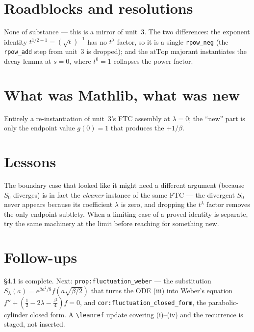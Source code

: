 \documentclass[11pt]{article}
\begin{document}
\section{Roadblocks and resolutions}
None of substance --- this is a mirror of unit~3. The two differences: the exponent identity
$t^{1/2-1}=(\sqrt t)^{-1}$ has no $t^\lambda$ factor, so it is a single \texttt{rpow\_neg} (the
\texttt{rpow\_add} step from unit~3 is dropped); and the $\mathrm{atTop}$ majorant instantiates the
decay lemma at $s=0$, where $t^0=1$ collapses the power factor.

\section{What was Mathlib, what was new}
Entirely a re-instantiation of unit~3's FTC assembly at $\lambda=0$; the ``new'' part is only the
endpoint value $g(0)=1$ that produces the $+1/\beta$.

\section{Lessons}
The boundary case that looked like it might need a different argument (because $S_0$ diverges) is in
fact the \emph{cleaner} instance of the same FTC --- the divergent $S_0$ never appears because its
coefficient $\lambda$ is zero, and dropping the $t^\lambda$ factor removes the only endpoint
subtlety. When a limiting case of a proved identity is separate, try the same machinery at the limit
before reaching for something new.

\section{Follow-ups}
\S4.1 is complete. Next: \texttt{prop:fluctuation\_weber} --- the substitution
$S_\lambda(a)=e^{\beta a^2/8}f(a\sqrt{\beta/2})$ that turns the ODE (iii) into Weber's equation
$f''+(\tfrac12-2\lambda-\tfrac{z^2}{4})f=0$, and \texttt{cor:fluctuation\_closed\_form}, the
parabolic-cylinder closed form. A \texttt{\textbackslash leanref} update covering (i)--(iv) and the
recurrence is staged, not inserted.
\end{document}
